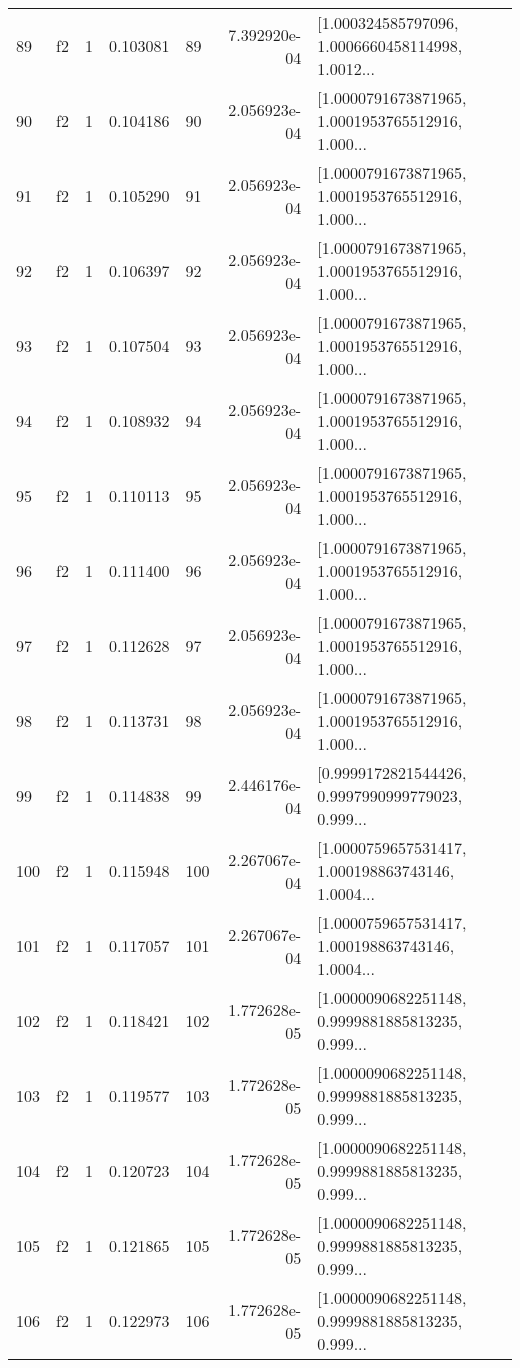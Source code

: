 \begin{tabular}{lllrlrl}
89  &  f2 &   1 &  0.103081 &   89 &  7.392920e-04 &  [1.000324585797096, 1.0006660458114998, 1.0012... \\
90  &  f2 &   1 &  0.104186 &   90 &  2.056923e-04 &  [1.0000791673871965, 1.0001953765512916, 1.000... \\
91  &  f2 &   1 &  0.105290 &   91 &  2.056923e-04 &  [1.0000791673871965, 1.0001953765512916, 1.000... \\
92  &  f2 &   1 &  0.106397 &   92 &  2.056923e-04 &  [1.0000791673871965, 1.0001953765512916, 1.000... \\
93  &  f2 &   1 &  0.107504 &   93 &  2.056923e-04 &  [1.0000791673871965, 1.0001953765512916, 1.000... \\
94  &  f2 &   1 &  0.108932 &   94 &  2.056923e-04 &  [1.0000791673871965, 1.0001953765512916, 1.000... \\
95  &  f2 &   1 &  0.110113 &   95 &  2.056923e-04 &  [1.0000791673871965, 1.0001953765512916, 1.000... \\
96  &  f2 &   1 &  0.111400 &   96 &  2.056923e-04 &  [1.0000791673871965, 1.0001953765512916, 1.000... \\
97  &  f2 &   1 &  0.112628 &   97 &  2.056923e-04 &  [1.0000791673871965, 1.0001953765512916, 1.000... \\
98  &  f2 &   1 &  0.113731 &   98 &  2.056923e-04 &  [1.0000791673871965, 1.0001953765512916, 1.000... \\
99  &  f2 &   1 &  0.114838 &   99 &  2.446176e-04 &  [0.9999172821544426, 0.9997990999779023, 0.999... \\
100 &  f2 &   1 &  0.115948 &  100 &  2.267067e-04 &  [1.0000759657531417, 1.000198863743146, 1.0004... \\
101 &  f2 &   1 &  0.117057 &  101 &  2.267067e-04 &  [1.0000759657531417, 1.000198863743146, 1.0004... \\
102 &  f2 &   1 &  0.118421 &  102 &  1.772628e-05 &  [1.0000090682251148, 0.9999881885813235, 0.999... \\
103 &  f2 &   1 &  0.119577 &  103 &  1.772628e-05 &  [1.0000090682251148, 0.9999881885813235, 0.999... \\
104 &  f2 &   1 &  0.120723 &  104 &  1.772628e-05 &  [1.0000090682251148, 0.9999881885813235, 0.999... \\
105 &  f2 &   1 &  0.121865 &  105 &  1.772628e-05 &  [1.0000090682251148, 0.9999881885813235, 0.999... \\
106 &  f2 &   1 &  0.122973 &  106 &  1.772628e-05 &  [1.0000090682251148, 0.9999881885813235, 0.999... \\

\end{tabular}

